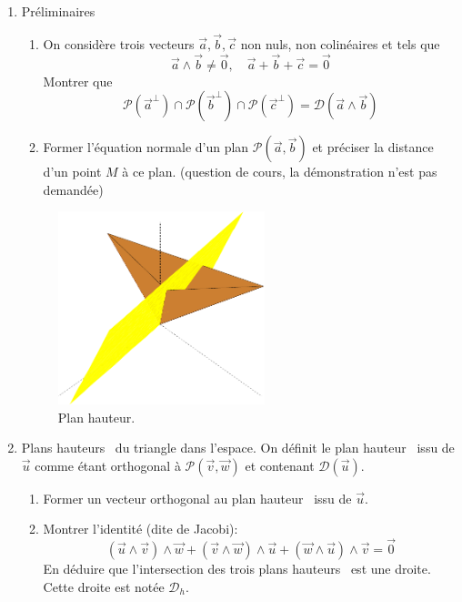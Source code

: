 \begin{enumerate}
\item Préliminaires
\begin{enumerate}
\item On considère trois vecteurs $\overrightarrow{a},\overrightarrow{b},\overrightarrow{c}$ non nuls, non colinéaires et tels que
\[\overrightarrow{a}\wedge\overrightarrow{b}\neq \overrightarrow{0}, \quad \overrightarrow{a}+\overrightarrow{b}+\overrightarrow{c}=\overrightarrow{0}\]
Montrer que
\[\mathcal{P}(\overrightarrow{a}^\bot) \cap \mathcal{P}(\overrightarrow{b}^\bot) \cap \mathcal{P}(\overrightarrow{c}^\bot) = \mathcal{D}(\overrightarrow{a}\wedge\overrightarrow{b})\]
\item Former l'équation normale d'un plan $\mathcal{P}(\overrightarrow{a},\overrightarrow{b})$ et préciser la distance d'un point $M$ à ce plan. (question de cours, la démonstration n'est pas demandée)
\end{enumerate}

\begin{figure}[ht]
   \centering
   \includegraphics[width=6cm]{Etriproj_1.pdf}
   \caption{Plan \og hauteur\fg.}
   \label{fig:Etriproj_1}
\end{figure}

\item Plans \og hauteurs\fg~ du triangle dans l'espace.\newline
On définit le plan \og hauteur\fg~ issu de $\overrightarrow{u}$ comme étant orthogonal à $\mathcal{P}(\overrightarrow{v},\overrightarrow{w})$ et contenant $\mathcal{D}(\overrightarrow{u})$.
\begin{enumerate}
\item Former un vecteur orthogonal au plan \og hauteur\fg~ issu de $\overrightarrow{u}$.

\item Montrer l'identité (dite de Jacobi):
\[
(\overrightarrow{u} \wedge \overrightarrow{v})\wedge \overrightarrow{w} +
(\overrightarrow{v} \wedge \overrightarrow{w})\wedge \overrightarrow{u} +
(\overrightarrow{w} \wedge \overrightarrow{u})\wedge \overrightarrow{v}
= \overrightarrow{0}\]
En déduire que l'intersection des trois plans \og hauteurs\fg~ est une droite. Cette droite est notée $\mathcal{D}_h$.
\end{enumerate}


\end{enumerate}
